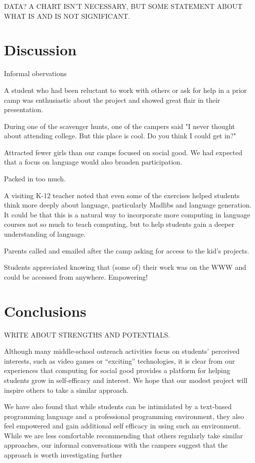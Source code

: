 DATA?  A CHART ISN'T NECESSARY, BUT SOME STATEMENT ABOUT WHAT IS AND
IS NOT SIGNIFICANT.

\section{Discussion}

Informal obervations

A student who had been reluctant to work with others or ask for help
in a prior camp was enthusiastic about the project and showed great
flair in their presentation.

During one of the scavenger hunts, one of the campers said "I never
thought about attending college.  But this place is cool.  Do you
think I could get in?"

Attracted fewer girls than our camps focused on social good.  We had
expected that a focus on language would also broaden participation.  

Packed in too much.

A visiting K-12 teacher noted that even some of the exercises helped
students think more deeply about language, particularly Madlibs and language
generation.  It could be that this is a natural way to incorporate more
computing in language courses not so much to teach computing, but to 
help students gain a deeper understanding of language.

Parents called and emailed after the camp asking for access to the
kid's projects.

Students appreciated knowing that (some of) their work was on the
WWW and could be accessed from anywhere.  Empowering!

\section{Conclusions}

WRITE ABOUT STRENGTHS AND POTENTIALS.

Although many middle-school outreach activities focus on students'
perceived interests, such as video games or ``exciting'' technologies,
it is clear from our experiences that computing for social good
provides a platform for helping students grow in self-efficacy and
interest.  We hope that our modest project will inspire others to
take a similar approach.

We have also found that while students can be intimidated by a text-based
programming language and a professional programming environment, they also
feel empowered and gain additional self efficacy in using such an environment.
While we are less comfortable recommending that others regularly take similar
approaches, our informal conversations with the campers suggest that the
approach is worth investigating further
